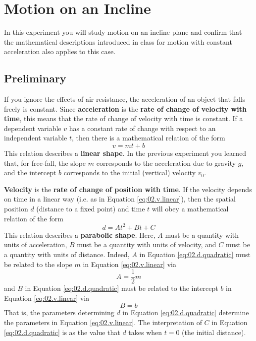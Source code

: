 \chapter{Motion on an Incline}
In this experiment you will study motion on an incline plane and confirm that the mathematical descriptions introduced in class for motion with constant acceleration also applies to this case.
\section{Preliminary}
If you ignore the effects of air resistance, the acceleration of an object that falls freely is constant. Since \textbf{acceleration} is the \textbf{rate of change of velocity with time}, this means that the rate of change of velocity with time is constant. If a dependent variable $v$ has a constant rate of change with respect to an independent variable $t$, then there is a mathematical relation of the form
\begin{equation}
    v = m t + b
    \label{eq:02.v.linear}
\end{equation}
This relation describes a \textbf{linear shape}. In the previous experiment you learned that, for free-fall, the slope $m$ corresponds to the acceleration due to gravity $g$, and the intercept $b$ corresponds to the initial (vertical) velocity $v_{0}$.

\textbf{Velocity} is the \textbf{rate of change of position with time}. If the velocity depends on time in a linear way (i.e. as in Equation \ref{eq:02.v.linear}), then the spatial position $d$ (distance to a fixed point) and time $t$ will obey a mathematical relation of the form
\begin{equation}
    d = A t^{2} + B t + C
    \label{eq:02.d.quadratic}
\end{equation}
This relation describes a \textbf{parabolic shape}. Here, $A$ must be a quantity with units of acceleration, $B$ must be a quantity with units of velocity, and $C$ must be a quantity with units of distance. Indeed, $A$ in Equation \ref{eq:02.d.quadratic} must be related to the slope $m$ in Equation \ref{eq:02.v.linear} via
\begin{equation}
    A = \frac{1}{2} m
\end{equation}
and $B$ in Equation \ref{eq:02.d.quadratic} must be related to the intercept $b$ in Equation \ref{eq:02.v.linear} via
\begin{equation}
    B = b
\end{equation}
That is, the parameters determining $d$ in Equation \ref{eq:02.d.quadratic} determine the parameters in Equation \ref{eq:02.v.linear}. The interpretation of $C$ in Equation \ref{eq:02.d.quadratic} is as the value that $d$ takes when $t = 0$ (the initial distance).

